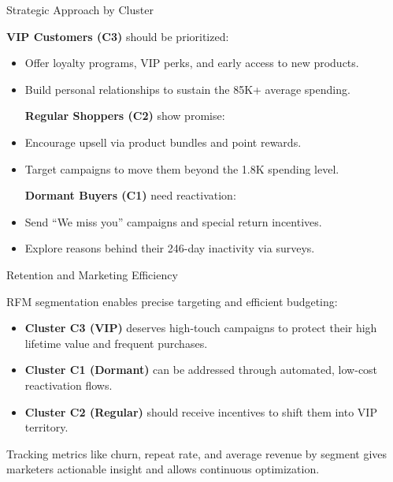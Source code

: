 \documentclass[aspectratio=169, table]{beamer}
\begin{document}
\begin{frame}{Strategic Approach by Cluster}
\vspace{20pt}

\textbf{VIP Customers (C3)} should be prioritized:

\begin{itemize}
\item Offer loyalty programs, VIP perks, and early access to new products.
\item Build personal relationships to sustain the 85K+ average spending.

\textbf{Regular Shoppers (C2)} show promise:
\item Encourage upsell via product bundles and point rewards.
\item Target campaigns to move them beyond the 1.8K spending level.

\textbf{Dormant Buyers (C1)} need reactivation:
\item Send “We miss you” campaigns and special return incentives.
\item Explore reasons behind their 246-day inactivity via surveys.
\end{itemize}
\end{frame}

\begin{frame}{Retention and Marketing Efficiency}
\vspace{20pt}

RFM segmentation enables precise targeting and efficient budgeting:

\begin{itemize}
\item \textbf{Cluster C3 (VIP)} deserves high-touch campaigns to protect their high lifetime value and frequent purchases.
\item \textbf{Cluster C1 (Dormant)} can be addressed through automated, low-cost reactivation flows.
\item \textbf{Cluster C2 (Regular)} should receive incentives to shift them into VIP territory.
\end{itemize}

Tracking metrics like churn, repeat rate, and average revenue by segment gives marketers actionable insight and allows continuous optimization.
\end{frame}
\end{document}
